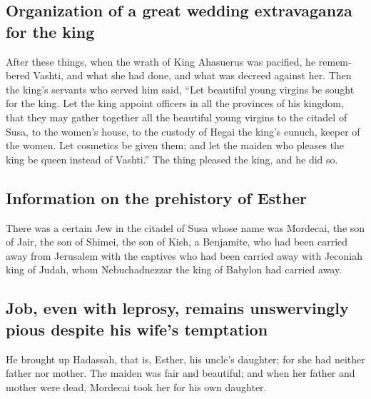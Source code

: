\begin{paracol}{2}
\begin{otherlanguage}{english}
\hypertarget{organization-of-a-great-wedding-extravaganza-for-the-king}{%
\subsection{Organization of a great wedding extravaganza for the
king}\label{organization-of-a-great-wedding-extravaganza-for-the-king}}

 After these things, when the wrath of King Ahasuerus was
pacified, he remembered Vashti, and what she had done, and what was
decreed against her.  Then the king's servants who served
him said, ``Let beautiful young virgins be sought for the king.
 Let the king appoint officers in all the provinces of his
kingdom, that they may gather together all the beautiful young virgins
to the citadel of Susa, to the women's house, to the custody of Hegai
the king's eunuch, keeper of the women. Let cosmetics be given them;
 and let the maiden who pleases the king be queen instead
of Vashti.'' The thing pleased the king, and he did so.

\hypertarget{information-on-the-prehistory-of-esther}{%
\subsection{Information on the prehistory of
Esther}\label{information-on-the-prehistory-of-esther}}

 There was a certain Jew in the citadel of Susa whose name
was Mordecai, the son of Jair, the son of Shimei, the son of Kish, a
Benjamite,  who had been carried away from Jerusalem with
the captives who had been carried away with Jeconiah king of Judah, whom
Nebuchadnezzar the king of Babylon had carried away.

\hypertarget{job-even-with-leprosy-remains-unswervingly-pious-despite-his-wifes-temptation}{%
\subsection{Job, even with leprosy, remains unswervingly pious despite
his wife's
temptation}\label{job-even-with-leprosy-remains-unswervingly-pious-despite-his-wifes-temptation}}

 He brought up Hadassah, that is, Esther, his uncle's
daughter; for she had neither father nor mother. The maiden was fair and
beautiful; and when her father and mother were dead, Mordecai took her
for his own daughter.


\end{otherlanguage}
\end{paracol}

